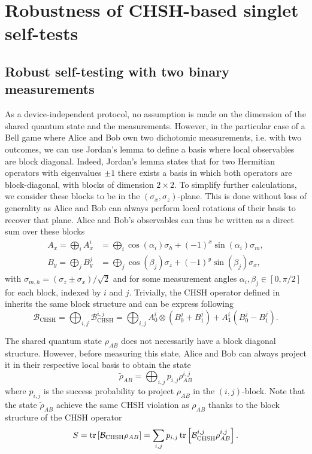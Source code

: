 \section{Robustness of CHSH-based singlet self-tests}

\subsection{Robust self-testing with two binary measurements}

As a device-independent protocol, no assumption is made on the dimension of the shared quantum state and the measurements.
However, in the particular case of a Bell game where Alice and Bob own two dichotomic measurements, i.e. with two outcomes, we can use Jordan's lemma to define a basis where local observables are block diagonal.
Indeed, Jordan's lemma states that for two Hermitian operators with eigenvalues $\pm1$ there exists a basis in which both operators are block-diagonal, with blocks of dimension $2 \times 2$.
To simplify further calculations, we consider these blocks to be in the $(\sigma_x,\sigma_z)$-plane.
This is done without loss of generality as Alice and Bob can always perform local rotations of their basis to recover that plane.
Alice and Bob's observables can thus be written as a direct sum over these blocks 
\begin{equation}
	\begin{split}
	A_x = \bigoplus_i A_x^i &= \bigoplus_i \cos(\alpha_i)\sigma_h + (-1)^x \sin(\alpha_i)\sigma_m, \\
	B_y = \bigoplus_j B_y^j &= \bigoplus_j \cos(\beta_j)\sigma_z + (-1)^y \sin(\beta_j)\sigma_x,
	\end{split}
	\label{eq:block_observables}
\end{equation}
with $\sigma_{m,h} = (\sigma_z \pm \sigma_x)/\sqrt{2}$ and for some measurement angles $\alpha_i,\beta_j\in[0,\pi/2]$ for each block, indexed by $i$ and $j$.
Trivially, the CHSH operator defined in  inherits the same block structure and can be express following
\begin{equation}
	\mathcal{B}_\text{CHSH} = \bigoplus_{i,j} \mathcal{B}_\text{CHSH}^{i,j} = \bigoplus_{i,j} A_0^i \otimes (B_0^j + B_1^j) + A_1^i (B_0^j - B_1^j).
	\label{eq:block_operator}
\end{equation}

The shared quantum state $\rho_{AB}$ does not necessarily have a block diagonal structure. 
However, before measuring this state, Alice and Bob can always project it in their respective local basis to obtain the state
\begin{equation}
	\tilde{\rho}_{AB} = \bigoplus_{i,j} p_{i,j}\rho_{AB}^{i,j}
\end{equation}
where $p_{i,j}$ is the success probability to project $\rho_{AB}$ in the $(i,j)$-block.
Note that the state $\tilde{\rho}_{AB}$ achieve the same CHSH violation as $\rho_{AB}$ thanks to the block structure of the CHSH operator
\begin{equation}
	S = \trr{\mathcal{B}_\text{CHSH}\rho_{AB}} = \sum_{i,j} p_{i,j} \trr{\mathcal{B}_\text{CHSH}^{i,j}\rho_{AB}^{i,j}}.
\end{equation}

